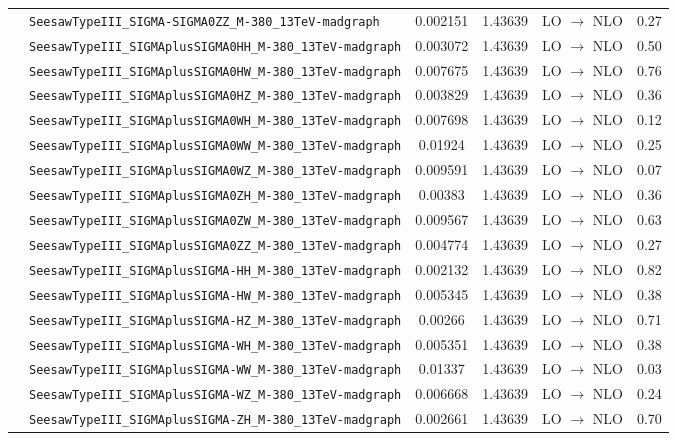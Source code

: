 \begin{longtable}{H l S[table-figures-decimal = 3, round-mode = figures, round-precision = 3] S l S}
 & \texttt{SeesawTypeIII\_SIGMA-SIGMA0ZZ\_M-380\_13TeV-madgraph} & 0.002151 & 1.43639 & LO $\rightarrow$ NLO & 0.27 \\
 & \texttt{SeesawTypeIII\_SIGMAplusSIGMA0HH\_M-380\_13TeV-madgraph} & 0.003072 & 1.43639 & LO $\rightarrow$ NLO & 0.50 \\
 & \texttt{SeesawTypeIII\_SIGMAplusSIGMA0HW\_M-380\_13TeV-madgraph} & 0.007675 & 1.43639 & LO $\rightarrow$ NLO & 0.76 \\
 & \texttt{SeesawTypeIII\_SIGMAplusSIGMA0HZ\_M-380\_13TeV-madgraph} & 0.003829 & 1.43639 & LO $\rightarrow$ NLO & 0.36 \\
 & \texttt{SeesawTypeIII\_SIGMAplusSIGMA0WH\_M-380\_13TeV-madgraph} & 0.007698 & 1.43639 & LO $\rightarrow$ NLO & 0.12 \\
 & \texttt{SeesawTypeIII\_SIGMAplusSIGMA0WW\_M-380\_13TeV-madgraph} & 0.01924 & 1.43639 & LO $\rightarrow$ NLO & 0.25 \\
 & \texttt{SeesawTypeIII\_SIGMAplusSIGMA0WZ\_M-380\_13TeV-madgraph} & 0.009591 & 1.43639 & LO $\rightarrow$ NLO & 0.07 \\
 & \texttt{SeesawTypeIII\_SIGMAplusSIGMA0ZH\_M-380\_13TeV-madgraph} & 0.00383 & 1.43639 & LO $\rightarrow$ NLO & 0.36 \\
 & \texttt{SeesawTypeIII\_SIGMAplusSIGMA0ZW\_M-380\_13TeV-madgraph} & 0.009567 & 1.43639 & LO $\rightarrow$ NLO & 0.63 \\
 & \texttt{SeesawTypeIII\_SIGMAplusSIGMA0ZZ\_M-380\_13TeV-madgraph} & 0.004774 & 1.43639 & LO $\rightarrow$ NLO & 0.27 \\
 & \texttt{SeesawTypeIII\_SIGMAplusSIGMA-HH\_M-380\_13TeV-madgraph} & 0.002132 & 1.43639 & LO $\rightarrow$ NLO & 0.82 \\
 & \texttt{SeesawTypeIII\_SIGMAplusSIGMA-HW\_M-380\_13TeV-madgraph} & 0.005345 & 1.43639 & LO $\rightarrow$ NLO & 0.38 \\
 & \texttt{SeesawTypeIII\_SIGMAplusSIGMA-HZ\_M-380\_13TeV-madgraph} & 0.00266 & 1.43639 & LO $\rightarrow$ NLO & 0.71 \\
 & \texttt{SeesawTypeIII\_SIGMAplusSIGMA-WH\_M-380\_13TeV-madgraph} & 0.005351 & 1.43639 & LO $\rightarrow$ NLO & 0.38 \\
 & \texttt{SeesawTypeIII\_SIGMAplusSIGMA-WW\_M-380\_13TeV-madgraph} & 0.01337 & 1.43639 & LO $\rightarrow$ NLO & 0.03 \\
 & \texttt{SeesawTypeIII\_SIGMAplusSIGMA-WZ\_M-380\_13TeV-madgraph} & 0.006668 & 1.43639 & LO $\rightarrow$ NLO & 0.24 \\
 & \texttt{SeesawTypeIII\_SIGMAplusSIGMA-ZH\_M-380\_13TeV-madgraph} & 0.002661 & 1.43639 & LO $\rightarrow$ NLO & 0.70 \\

\end{longtable}

